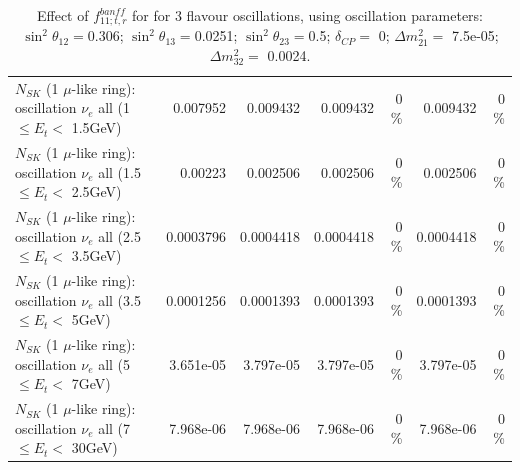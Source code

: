 \begin{table}
\begin{tabular}{| l | r | r | r  r | r  r |}
$N_{SK}$ (1 $\mu$-like ring): oscillation $\nu_{e}$ all (1 $\leq E_{t} <$ 1.5GeV) &        0.007952 &        0.009432 &        0.009432 &        0 \%  &        0.009432 &        0 \%  \\ 
$N_{SK}$ (1 $\mu$-like ring): oscillation $\nu_{e}$ all (1.5 $\leq E_{t} <$ 2.5GeV) &         0.00223 &        0.002506 &        0.002506 &        0 \%  &        0.002506 &        0 \%  \\ 
$N_{SK}$ (1 $\mu$-like ring): oscillation $\nu_{e}$ all (2.5 $\leq E_{t} <$ 3.5GeV) &       0.0003796 &       0.0004418 &       0.0004418 &        0 \%  &       0.0004418 &        0 \%  \\ 
$N_{SK}$ (1 $\mu$-like ring): oscillation $\nu_{e}$ all (3.5 $\leq E_{t} <$ 5GeV) &       0.0001256 &       0.0001393 &       0.0001393 &        0 \%  &       0.0001393 &        0 \%  \\ 
 $N_{SK}$ (1 $\mu$-like ring): oscillation $\nu_{e}$ all (5 $\leq E_{t} <$ 7GeV) &       3.651e-05 &       3.797e-05 &       3.797e-05 &        0 \%  &       3.797e-05 &        0 \%  \\ 
$N_{SK}$ (1 $\mu$-like ring): oscillation $\nu_{e}$ all (7 $\leq E_{t} <$ 30GeV) &       7.968e-06 &       7.968e-06 &       7.968e-06 &        0 \%  &       7.968e-06 &        0 \%  \\ 
\hline
\hline
\end{tabular}
\caption{ Effect of $f_{11; t, r}^{banff}$ for for 3 flavour oscillations, using oscillation parameters:  $\sin^2\theta_{12} = $0.306; $\sin^2\theta_{13} = $0.0251; $\sin^2\theta_{23} = $0.5; $\delta_{CP} = $        0; $\Delta m^2_{21} = $    7.5e-05; $\Delta m^2_{32} = $    0.0024. }
\label{tab:num_banff_11_1RmuT_3f_osc_t13:0.0251}
\end{table}
\clearpage
